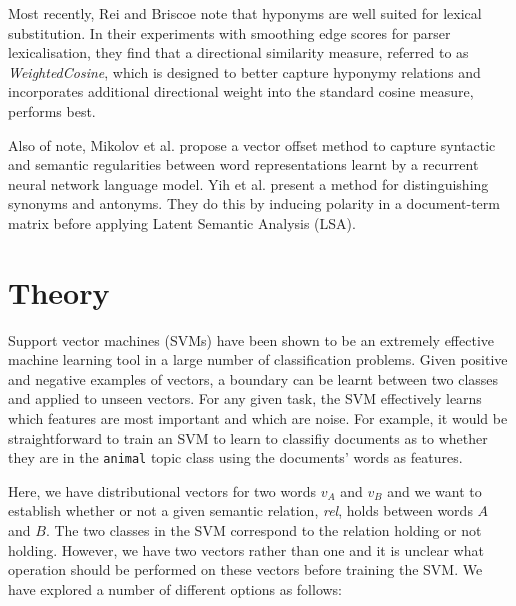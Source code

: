 \documentclass[11pt]{article}
\begin{document}
Most recently, Rei and Briscoe  note that hyponyms are well suited for lexical substitution.  In their experiments with smoothing edge scores for parser lexicalisation, they find that a directional similarity measure, referred to as \emph{WeightedCosine}, which is designed to better capture hyponymy relations and incorporates additional directional weight into the standard cosine measure, performs best.

Also of note, Mikolov et al.  propose a vector offset method to capture syntactic and semantic regularities between word representations learnt by a recurrent neural network language model.  Yih et al.  present a method for distinguishing synonyms and antonyms.  They do this by inducing polarity in a document-term matrix before applying Latent Semantic Analysis (LSA).

\section{Theory}
\label{sect:theory}
Support vector machines (SVMs) have been shown to be an extremely effective machine learning tool in a large number of classification problems.  Given positive and negative examples of vectors, a boundary can be learnt between two classes and applied to unseen vectors.  For any given task, the SVM effectively learns which features are most important and which are noise.  For example, it would be straightforward to train an SVM to learn to classifiy documents as to whether they are in the \texttt{animal} topic class using the documents' words as features.     

Here, we have distributional vectors for two words $v_A$ and $v_B$ and we want to establish whether or not a given semantic relation, \emph{rel}, holds between words $A$ and $B$. The two classes in the SVM correspond to the relation holding or not holding.  However, we have two vectors rather than one and it is unclear what operation should be performed on these vectors before training the SVM.  We have explored a number of different options as follows:
\end{document}
